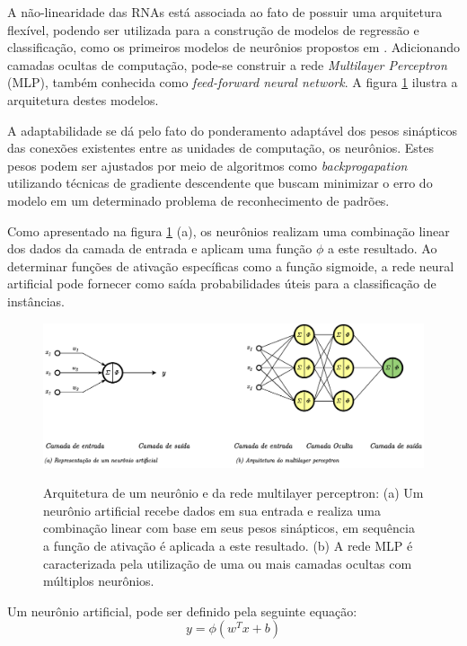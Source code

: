 A não-linearidade das RNAs está associada ao fato de possuir uma arquitetura flexível, podendo ser utilizada para a construção de modelos de regressão e classificação, como os primeiros modelos de neurônios propostos em . Adicionando camadas ocultas de computação, pode-se construir a rede \textit{Multilayer Perceptron} (MLP), também conhecida como \textit{feed-forward neural network}. A figura \ref{fig:perceptron} ilustra a arquitetura destes modelos.

A adaptabilidade se dá pelo fato do ponderamento adaptável dos pesos sinápticos das conexões existentes entre as unidades de computação, os neurônios. Estes pesos podem ser ajustados por meio de algoritmos como \textit{backprogapation} utilizando técnicas de gradiente descendente que buscam minimizar o erro do modelo em um determinado problema de reconhecimento de padrões.

Como apresentado na figura \ref{fig:perceptron} (a), os neurônios realizam uma combinação linear dos dados da camada de entrada e aplicam uma função $\phi$ a este resultado. Ao determinar funções de ativação específicas como a função sigmoide, a rede neural artificial pode fornecer como saída probabilidades úteis para a classificação de instâncias.

\begin{figure}[htbp]
	\centering
	\caption{Arquitetura de um neurônio e da rede multilayer perceptron: (a) Um neurônio artificial recebe dados em sua entrada e realiza uma combinação linear com base em seus pesos sinápticos, em sequência a função de ativação é aplicada a este resultado. (b) A rede MLP é caracterizada pela utilização de uma ou mais camadas ocultas com múltiplos neurônios.}
		\includegraphics[scale=.25]{imagens/perceptron.png}
	\label{fig:perceptron}
\end{figure}

Um neurônio artificial, pode ser definido pela seguinte equação:
\begin{equation}
    y = \phi(w^{T}x + b)
\end{equation}

